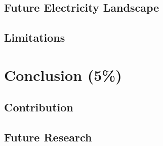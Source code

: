 \documentclass[a4paper]{article}
\begin{document}
\subsection{Future Electricity Landscape}
\label{sec:org8321a3e}
\subsection{Limitations}
\label{sec:org4f587a0}
\section{Conclusion (5\%)}
\label{sec:org95d94d7}
\subsection{Contribution}
\label{sec:orgdf98512}
\subsection{Future Research}
\label{sec:org08f389a}



\clearpage
\printbibliography
\end{document}
